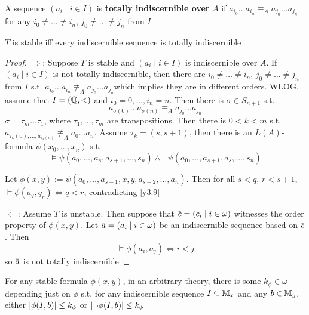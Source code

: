 \documentclass[11pt]{article}
\begin{document}
\begin{definition}[]
A sequence \((a_i\mid i\in I)\) is \textbf{totally indiscernible over} \(A\)
if \(a_{i_0}\dots a_{i_n}\equiv_Aa_{j_0}\dots a_{j_n}\) for any \(i_0\neq\dots\neq i_n\), \(j_0\neq\dots\neq j_n\) from \(I\)
\end{definition}

\begin{theorem}[]
\(T\) is stable iff every indiscernible sequence is totally indiscernible
\end{theorem}

\begin{proof}
\(\Rightarrow\): Suppose \(T\) is stable and \((a_i\mid i\in I)\) is indiscernible over \(A\).
If \((a_i\mid i\in I)\) is not totally indiscernible, then there are  \(i_0\neq\dots\neq i_n\), \(j_0\neq\dots\neq j_n\)
from \(I\) s.t. \(a_{i_0}\dots a_{i_n}\not\equiv_Aa_{j_0}\dots a_{j_n}\)which implies they are in different orders. WLOG, assume that \(I=(\mathbb{Q},<)\)
and \(i_0=0,\dots,i_n=n\). Then there is \(\sigma\in S_{n+1}\) s.t.
\begin{equation*}
a_{\sigma(0)}\dots a_{\sigma(n)}\equiv_Aa_{j_0}\dots a_{j_n}
\end{equation*}
\(\sigma=\tau_m\dots\tau_1\), where \(\tau_1,\dots,\tau_m\) are transpositions. Then there is \(0<k<m\)
s.t. \(a_{\tau_k(0),\dots,a_{\tau_k(n)}}\not\equiv_A a_0\dots a_n\). Assume \(\tau_k=(s,s+1)\), then there is
an \(L(A)\)-formula \(\psi(x_0,\dots,x_n)\) s.t.
\begin{equation*}
\vDash\psi(a_0,\dots,a_s,a_{s+1},\dots,s_n)\wedge\neg\psi(a_0,\dots,a_{s+1},a_s,\dots,s_n)
\end{equation*}

Let \(\phi(x,y):=\psi(a_0,\dots,a_{s-1},x,y,a_{s+2},\dots,a_n)\). Then for
all \(s<q\), \(r<s+1\), \(\vDash\phi(a_q,q_r)\Leftrightarrow q<r\), contradicting \ref{y3.9}

\(\Leftarrow\): Assume \(T\) is unstable. Then suppose that \(\barc=(c_i\mid i\in\omega)\) witnesses the order
property of \(\phi(x,y)\). Let \(\bara=(a_i\mid i\in\omega)\) be an indiscernible sequence based on \(\barc\).
Then
\begin{equation*}
\vDash\phi(a_i,a_j)\Leftrightarrow i<j
\end{equation*}
so \(\bara\) is not totally indiscernible
\end{proof}

\begin{proposition}[]
\label{y4.13}
For any stable formula \(\phi(x,y)\), in an arbitrary theory, there is some \(k_\phi\in\omega\) depending just
on \(\phi\) s.t. for any indiscernible sequence \(I\subseteq\mathbb{M}_x\) and any \(b\in\mathbb{M}_y\),
either \(\abs{\phi(I,b)}\le k_\phi\) or \(\abs{\neg\phi(I,b)}\le k_\phi\)
\end{proposition}
\end{document}
